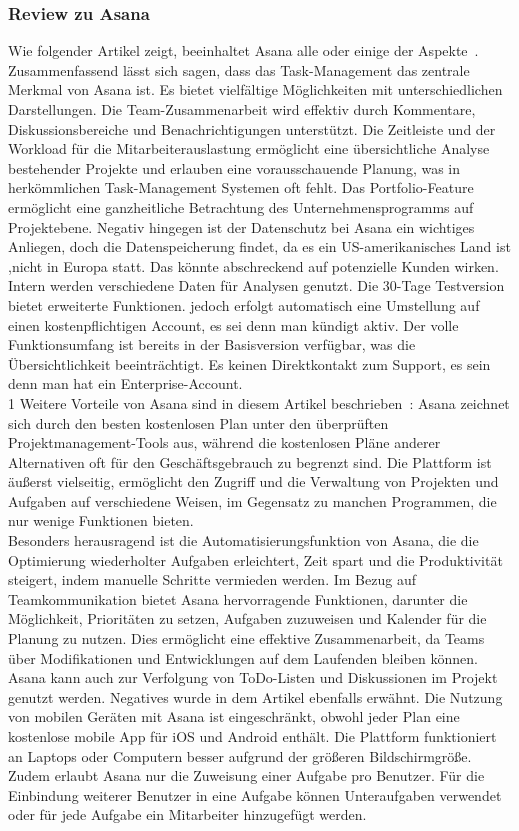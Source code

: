 \documentclass[sigconf, nonacm]{acmart}
\begin{document}
\subsubsection{Review zu Asana}
Wie folgender Artikel zeigt, beeinhaltet Asana alle oder einige der Aspekte~\cite{venzmer_projektmanagement_2020}. Zusammenfassend lässt sich sagen, dass das Task-Management das zentrale Merkmal von Asana ist. Es bietet vielfältige Möglichkeiten mit unterschiedlichen Darstellungen. Die Team-Zusammenarbeit wird effektiv durch Kommentare, Diskussionsbereiche und Benachrichtigungen unterstützt. Die Zeitleiste und der Workload für die Mitarbeiterauslastung ermöglicht eine übersichtliche Analyse bestehender Projekte und erlauben eine vorausschauende Planung, was in herkömmlichen Task-Management Systemen oft fehlt. Das Portfolio-Feature ermöglicht eine ganzheitliche Betrachtung des Unternehmensprogramms auf Projektebene.
Negativ hingegen ist der Datenschutz bei Asana ein wichtiges Anliegen, doch die Datenspeicherung findet, da es ein US-amerikanisches Land ist ,nicht in Europa statt. Das könnte abschreckend auf potenzielle Kunden wirken. Intern werden verschiedene Daten für Analysen genutzt. Die 30-Tage Testversion bietet erweiterte Funktionen. jedoch erfolgt automatisch eine Umstellung auf einen kostenpflichtigen Account, es sei denn man kündigt aktiv. Der volle Funktionsumfang ist bereits in der Basisversion verfügbar, was die Übersichtlichkeit beeinträchtigt. Es keinen Direktkontakt zum Support, es sein denn man hat ein Enterprise-Account.\\1
Weitere Vorteile von Asana sind in diesem Artikel beschrieben~\cite{noauthor_asana_nodate}:
Asana zeichnet sich durch den besten kostenlosen Plan unter den überprüften Projektmanagement-Tools aus, während die kostenlosen Pläne anderer Alternativen oft für den Geschäftsgebrauch zu begrenzt sind. Die Plattform ist äußerst vielseitig, ermöglicht den Zugriff und die Verwaltung von Projekten und Aufgaben auf verschiedene Weisen, im Gegensatz zu manchen Programmen, die nur wenige Funktionen bieten.\\
Besonders herausragend ist die Automatisierungsfunktion von Asana, die die Optimierung wiederholter Aufgaben erleichtert, Zeit spart und die Produktivität steigert, indem manuelle Schritte vermieden werden.
Im Bezug auf Teamkommunikation bietet Asana hervorragende Funktionen, darunter die Möglichkeit, Prioritäten zu setzen, Aufgaben zuzuweisen und Kalender für die Planung zu nutzen. Dies ermöglicht eine effektive Zusammenarbeit, da Teams über Modifikationen und Entwicklungen auf dem Laufenden bleiben können. Asana kann auch zur Verfolgung von ToDo-Listen und Diskussionen im Projekt genutzt werden.
Negatives wurde in dem Artikel ebenfalls erwähnt. Die Nutzung von mobilen Geräten mit Asana ist eingeschränkt, obwohl jeder Plan eine kostenlose mobile App für iOS und Android enthält. Die Plattform funktioniert an Laptops oder Computern besser aufgrund der größeren Bildschirmgröße. Zudem erlaubt Asana nur die Zuweisung einer Aufgabe pro Benutzer. Für die Einbindung weiterer Benutzer in eine Aufgabe können Unteraufgaben verwendet oder für jede Aufgabe ein Mitarbeiter hinzugefügt werden.
\end{document}
